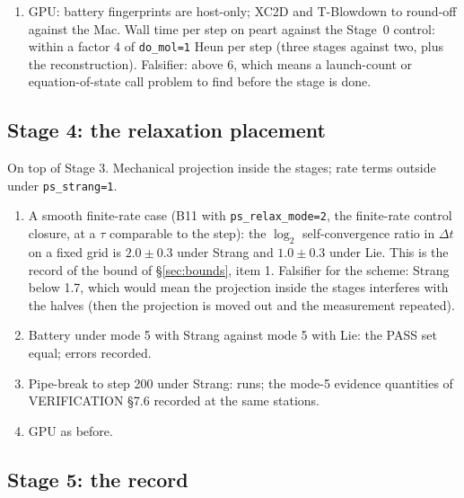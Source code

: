\documentclass[11pt,a4paper]{article}
\newcommand{\code}[1]{\texttt{\small #1}}
\newcommand{\Dt}{\Delta t}
\begin{document}
\begin{enumerate}[nosep]
      recorded.  Falsifier for option 0 as a default candidate: a wiggle
      larger than under the full Lax--Wendroff correction (MODEL \S3.4
      table), which would mean the smoothness measure does not do the
      taper's job and option 1 is the default.  Battery interface cases
      (B-series with a material contact) under both: every check kept
      under both, \code{energyid} on B9 no larger than now under both.
\item GPU: battery fingerprints are host-only; XC2D and T-Blowdown to
      round-off against the Mac.  Wall time per step on peart against the
      Stage~0 control: within a factor 4 of \code{do\_mol=1} Heun per step
      (three stages against two, plus the reconstruction).  Falsifier:
      above 6, which means a launch-count or equation-of-state call
      problem to find before the stage is done.
\end{enumerate}

\subsection*{Stage 4: the relaxation placement}

On top of Stage 3.  Mechanical projection inside the stages; rate terms
outside under \code{ps\_strang=1}.

\begin{enumerate}[nosep]
\item A smooth finite-rate case (B11 with \code{ps\_relax\_mode=2}, the
      finite-rate control closure, at a $\tau$ comparable to the step): the
      $\log_2$ self-convergence ratio in $\Dt$ on a fixed grid is
      $2.0\pm0.3$ under Strang and $1.0\pm0.3$ under Lie.  This is the
      record of the bound of \S\ref{sec:bounds}, item 1.  Falsifier for
      the scheme: Strang below 1.7, which would mean the projection inside
      the stages interferes with the halves (then the projection is moved
      out and the measurement repeated).
\item Battery under mode 5 with Strang against mode 5 with Lie: the PASS
      set equal; errors recorded.
\item Pipe-break to step 200 under Strang: runs; the mode-5 evidence
      quantities of VERIFICATION \S7.6 recorded at the same stations.
\item GPU as before.
\end{enumerate}

\subsection*{Stage 5: the record}
\end{document}
